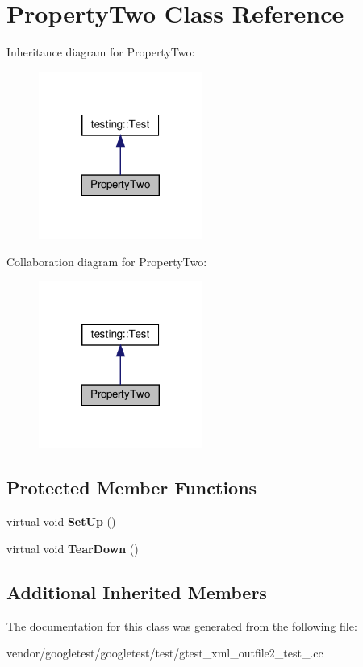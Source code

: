 \hypertarget{class_property_two}{}\section{Property\+Two Class Reference}
\label{class_property_two}


Inheritance diagram for Property\+Two\+:
\nopagebreak
\begin{figure}[H]
\begin{center}
\leavevmode
\includegraphics[width=152pt]{class_property_two__inherit__graph}
\end{center}
\end{figure}


Collaboration diagram for Property\+Two\+:
\nopagebreak
\begin{figure}[H]
\begin{center}
\leavevmode
\includegraphics[width=152pt]{class_property_two__coll__graph}
\end{center}
\end{figure}
\subsection*{Protected Member Functions}
\begin{DoxyCompactItemize}
\item 
\mbox{\label{class_property_two_aa3ab39cf4e6c751cb0788c575bf92ca2}} 
virtual void {\bfseries Set\+Up} ()
\item 
\mbox{\label{class_property_two_aa4ffb2b9dddeba69f0f9baf133f06ef2}} 
virtual void {\bfseries Tear\+Down} ()
\end{DoxyCompactItemize}
\subsection*{Additional Inherited Members}


The documentation for this class was generated from the following file\+:\begin{DoxyCompactItemize}
\item 
vendor/googletest/googletest/test/gtest\+\_\+xml\+\_\+outfile2\+\_\+test\+\_\+.\+cc\end{DoxyCompactItemize}
